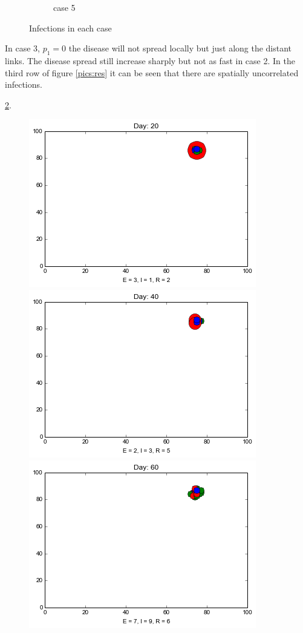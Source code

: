 \begin{figure}[h]
\begin{subfigure}[b]{0.3\textwidth}
        \caption{case 5}
        \label{e}
    \end{subfigure}
    \caption{Infections in each case}\label{fig:animals}
\end{figure}

In case 3, $p_1 = 0$ the disease will not spread locally but just along the distant links. The disease spread still increase sharply but not as fast in case 2. In the third row of figure \ref{pics:res} it can be seen that there are spatially uncorrelated infections.

 \ref{fig:animals}. 
\begin{figure}[h]
\centering
\includegraphics[scale=0.28]{images/1t20.png} \quad
\includegraphics[scale=0.28]{images/1t40.png} \quad
\includegraphics[scale=0.28]{images/1t60.png} \quad

\end{figure}
